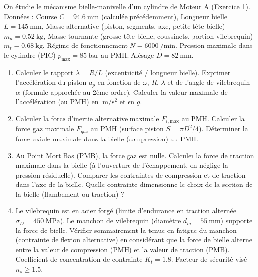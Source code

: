 \documentclass[11pt]{article}
\begin{document}
\begin{exercice}
On étudie le mécanisme bielle-manivelle d'un cylindre de Moteur A (Exercice 1). Données : Course $C = \SI{94.6}{\milli\meter}$ (calculée précédemment), Longueur bielle $L = \SI{145}{\milli\meter}$, Masse alternative (piston, segments, axe, petite tête bielle) $m_a = \SI{0.52}{\kilo\gram}$, Masse tournante (grosse tête bielle, coussinets, portion vilebrequin) $m_t = \SI{0.68}{\kilo\gram}$. Régime de fonctionnement $N = \SI{6000}{\per\minute}$. Pression maximale dans le cylindre (PIC) $p_{\text{max}} = \SI{85}{\bar}$ au PMH. Alésage $D = \SI{82}{\milli\meter}$.
\begin{enumerate}
    \item Calculer le rapport $\lambda = R/L$ (excentricité / longueur bielle). Exprimer l'accélération du piston $a_p$ en fonction de $\omega$, $R$, $\lambda$ et de l'angle de vilebrequin $\alpha$ (formule approchée au 2ème ordre). Calculer la valeur maximale de l'accélération (au PMH) en $\SI{}{\meter\per\second\squared}$ et en $g$.
    \item Calculer la force d'inertie alternative maximale $F_{i,\text{max}}$ au PMH. Calculer la force gaz maximale $F_{gaz}$ au PMH (surface piston $S = \pi D^2/4$). Déterminer la force axiale maximale dans la bielle (compression) au PMH.
    \item Au Point Mort Bas (PMB), la force gaz est nulle. Calculer la force de traction maximale dans la bielle (à l'ouverture de l'échappement, on néglige la pression résiduelle). Comparer les contraintes de compression et de traction dans l'axe de la bielle. Quelle contrainte dimensionne le choix de la section de la bielle (flambement ou traction) ?
    \item Le vilebrequin est en acier forgé (limite d'endurance en traction alternée $\sigma_D = \SI{450}{\mega\pascal}$). Le manchon de vilebrequin (diamètre $d_m = \SI{55}{\milli\meter}$) supporte la force de bielle. Vérifier sommairement la tenue en fatigue du manchon (contrainte de flexion alternative) en considérant que la force de bielle alterne entre la valeur de compression (PMH) et la valeur de traction (PMB). Coefficient de concentration de contrainte $K_t = 1.8$. Facteur de sécurité visé $n_s \ge 1.5$.
\end{enumerate}
\end{exercice}
\end{document}
